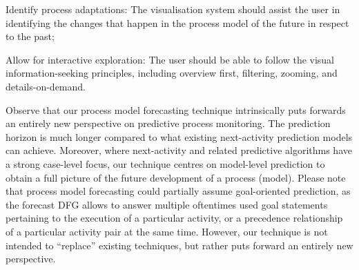 \begin{requidescr}
	\item[Identify process adaptations:\namedlabel{req:adaptation}] The visualisation system should assist the user in identifying the changes that happen in the process model of the future in respect to the past;
	\item[Allow for interactive exploration:\namedlabel{req:interactive}] The user should be able to follow the visual information-seeking principles, including overview first, filtering, zooming, and details-on-demand.
\end{requidescr} %

Observe that our process model forecasting technique intrinsically puts forwards an entirely new perspective on predictive process monitoring. The prediction horizon is much longer compared to what existing next-activity prediction models can achieve. Moreover, where next-activity and related predictive algorithms have a strong case-level focus, our technique centres on model-level prediction to obtain a full picture of the future development of a process (model). Please note that process model forecasting could partially assume goal-oriented prediction, as the forecast DFG allows to answer multiple oftentimes used goal statements pertaining to the execution of a particular activity, or a precedence relationship of a particular activity pair \cite{DBLP:journals/tkdd/TeinemaaDRM19} at the same time. However, our technique is not intended to ``replace'' existing techniques, but rather puts forward an entirely new perspective.

